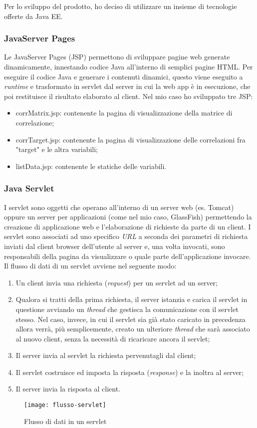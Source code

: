 Per lo sviluppo del prodotto, ho deciso di utilizzare un insieme di tecnologie offerte da Java EE.
\subsubsection{JavaServer Pages}
Le JavaServer Pages (JSP) permettono di sviluppare pagine web generate dinamicamente, innestando codice Java all'interno di semplici pagine HTML. Per eseguire il codice Java e generare i contenuti dinamici, questo viene eseguito a \textit{runtime} e trasformato in servlet dal server in cui la \gls{web app} è in esecuzione, che poi restituisce il risultato elaborato al client.
Nel mio caso ho sviluppato tre JSP:
\begin{itemize}
	\item corrMatrix.jsp: contenente la pagina di visualizzazione della matrice di correlazione;
	\item corrTarget.jsp: contenente la pagina di visualizzazione delle correlazioni fra "target" e le altra variabili;
	\item listData.jsp: contenente le statiche delle variabili.
\end{itemize}
\subsubsection{Java Servlet}
I servlet sono oggetti che operano all'interno di un server web (es. Tomcat) oppure un server per applicazioni (come nel mio caso, GlassFish) permettendo la creazione di applicazione web e l'elaborazione di richieste da parte di un client.
I servlet sono associati ad uno specifico \textit{URL} a seconda dei parametri di richiesta inviati dal client browser dell'utente al server e, una volta invocati, sono responsabili della pagina da visualizzare o quale parte dell'applicazione invocare.\\
Il flusso di dati di un servlet avviene nel seguente modo:
\begin{enumerate}
	\item Un client invia una richiesta (\textit{request}) per un servlet ad un server;
	\item Qualora si tratti della prima richiesta, il server istanzia e carica il servlet in questione avviando un \textit{thread} che gestisca la comunicazione con il servlet stesso. Nel caso, invece, in cui il servlet sia già stato caricato in precedenza allora verrà, più semplicemente, creato un ulteriore \textit{thread} che sarà associato al nuovo client, senza la necessità di ricaricare ancora il servlet;
	\item Il server invia al servlet la richiesta pervenutagli dal client;
	\item Il servlet costruisce ed imposta la risposta (\textit{response}) e la inoltra al server;
	\item Il server invia la risposta al client.
\end{enumerate}
\begin{figure}[!h]
	\centering
	\texttt{[image: flusso-servlet]}
	\caption{Flusso di dati in un servlet}
\end{figure}

